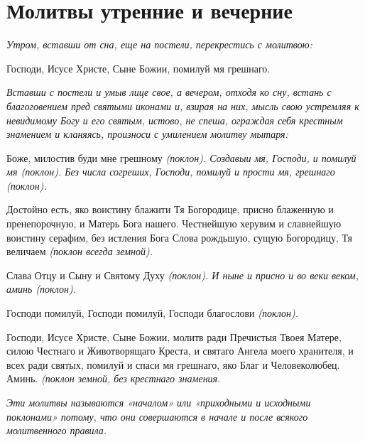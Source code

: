 

\label{_content_edinovercheskie-molitvi}

 


 

\section{Молитвы утренние и вечерние}
 


\itshape Утром, вставши от сна, еще на постели, перекрестись с молитвою:\normalfont{}


Господи, Исусе Христе, Сыне Божии, помилуй мя грешнаго.


\medskip\itshape Вставши с постели и умыв лице свое, а вечером, отходя ко сну, встань с благоговением пред святыми иконами и, взирая на них, мысль свою устремляя к невидимому Богу и его святым, истово, не спеша, ограждая себя крестным знамением и кланяясь, произноси с умилением молитву мытаря:\normalfont{}


Боже, милостив буди мне грешному \itshape (поклон)\normalfont{}. Создавыи мя, Господи, и помилуй мя \itshape (поклон)\normalfont{}. Без числа согреших, Господи, помилуй и прости мя, грешнаго \itshape (поклон)\normalfont{}.


Достойно есть, яко воистину блажити Тя Богородице, присно блаженную и пренепорочную, и Матерь Бога нашего. Честнейшую херувим и славнейшую воистину серафим, без истления Бога Слова рождьшую, сущую Богородицу, Тя величаем \itshape (поклон всегда земной)\normalfont{}.


Слава Отцу и Сыну и Святому Духу \itshape (поклон)\normalfont{}. И ныне и присно и во веки веком, аминь \itshape (поклон)\normalfont{}.


Господи помилуй, Господи помилуй, Господи благослови \itshape (поклон)\normalfont{}. 


Господи, Исусе Христе, Сыне Божии, молитв ради Пречистыя Твоея Матере, силою Честнаго и Животворящаго Креста, и святаго Ангела моего хранителя, и всех ради святых, помилуй и спаси мя грешнаго, яко Благ и Человеколюбец. Аминь. \itshape (поклон земной, без крестнаго знамения\normalfont{}.


\medskip\itshape Эти молитвы называются «началом» или «приходными и исходными поклонами» потому, что они совершаются в начале и после всякого молитвенного правила.\normalfont{}


